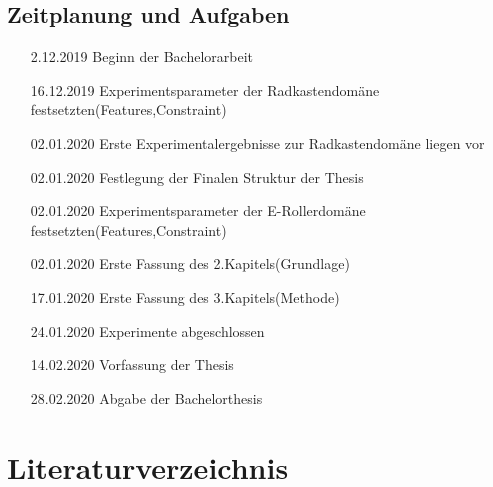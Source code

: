 \documentclass[12pt]{article}
\begin{document}
\begin{appendix}
\section{Zeitplanung und Aufgaben}
\begin{itemize}
	\item[2.12.2019] Beginn der Bachelorarbeit
	\item[16.12.2019] Experimentsparameter der Radkastendomäne festsetzten(Features,Constraint)
	\item[02.01.2020] Erste Experimentalergebnisse zur Radkastendomäne liegen vor
	\item[02.01.2020] Festlegung der Finalen Struktur der Thesis
	\item[02.01.2020] Experimentsparameter der E-Rollerdomäne festsetzten(Features,Constraint)
	\item[02.01.2020] Erste Fassung des 2.Kapitels(Grundlage)
	\item[17.01.2020] Erste Fassung des 3.Kapitels(Methode)
	\item[24.01.2020] Experimente abgeschlossen
	\item[14.02.2020] Vorfassung der Thesis
	\item[28.02.2020] Abgabe der Bachelorthesis
\end{itemize}

\end{appendix}
  
\newpage{}
\section{Literaturverzeichnis}

\newpage{}
\end{document}
